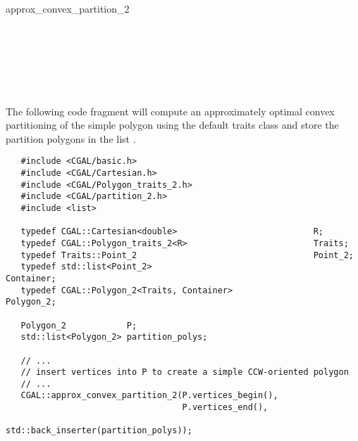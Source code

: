 \begin{ccRefFunction}{approx_convex_partition_2}
\ccSeeAlso

 \\
 \\
 \\
 \\
 \\

\ccExample

The following code fragment will compute an approximately optimal
convex partitioning of the simple polygon  using the default
traits class and store the partition polygons in the list 
.

\begin{verbatim}
   #include <CGAL/basic.h>
   #include <CGAL/Cartesian.h>
   #include <CGAL/Polygon_traits_2.h>
   #include <CGAL/partition_2.h>
   #include <list>

   typedef CGAL::Cartesian<double>                           R;
   typedef CGAL::Polygon_traits_2<R>                         Traits;
   typedef Traits::Point_2                                   Point_2;
   typedef std::list<Point_2>                                Container;
   typedef CGAL::Polygon_2<Traits, Container>                Polygon_2;

   Polygon_2            P;
   std::list<Polygon_2> partition_polys;

   // ...
   // insert vertices into P to create a simple CCW-oriented polygon
   // ...
   CGAL::approx_convex_partition_2(P.vertices_begin(),
                                   P.vertices_end(),
                                   std::back_inserter(partition_polys));
\end{verbatim}

\end{ccRefFunction}
